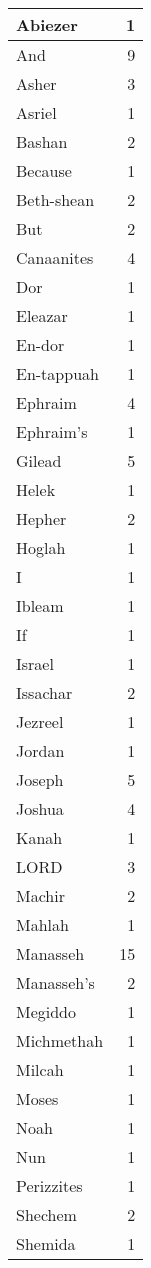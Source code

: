 \begin{center}
\begin{longtable}{l|r}
\hline \hline
\endlastfoot
Abiezer & 1 \\ \hline
And & 9 \\ \hline
Asher & 3 \\ \hline
Asriel & 1 \\ \hline
Bashan & 2 \\ \hline
Because & 1 \\ \hline
Beth-shean & 2 \\ \hline
But & 2 \\ \hline
Canaanites & 4 \\ \hline
Dor & 1 \\ \hline
Eleazar & 1 \\ \hline
En-dor & 1 \\ \hline
En-tappuah & 1 \\ \hline
Ephraim & 4 \\ \hline
Ephraim's & 1 \\ \hline
Gilead & 5 \\ \hline
Helek & 1 \\ \hline
Hepher & 2 \\ \hline
Hoglah & 1 \\ \hline
I & 1 \\ \hline
Ibleam & 1 \\ \hline
If & 1 \\ \hline
Israel & 1 \\ \hline
Issachar & 2 \\ \hline
Jezreel & 1 \\ \hline
Jordan & 1 \\ \hline
Joseph & 5 \\ \hline
Joshua & 4 \\ \hline
Kanah & 1 \\ \hline
LORD & 3 \\ \hline
Machir & 2 \\ \hline
Mahlah & 1 \\ \hline
Manasseh & 15 \\ \hline
Manasseh's & 2 \\ \hline
Megiddo & 1 \\ \hline
Michmethah & 1 \\ \hline
Milcah & 1 \\ \hline
Moses & 1 \\ \hline
Noah & 1 \\ \hline
Nun & 1 \\ \hline
Perizzites & 1 \\ \hline
Shechem & 2 \\ \hline
Shemida & 1 \\ \hline

\end{longtable}
\end{center}
